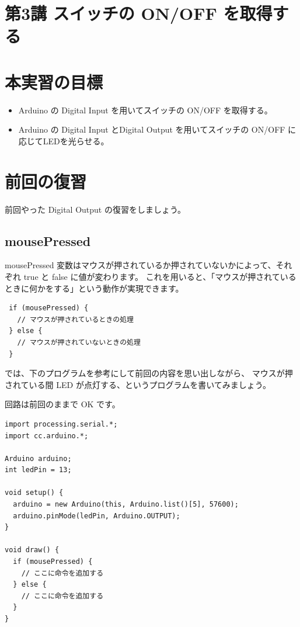 \documentclass[11pt,a4paper]{jarticle}
\begin{document}
\section*{\LARGE{第3講 スイッチの ON/OFF を取得する}}
\section{本実習の目標}
\begin{itemize}
 \item Arduino の Digital Input を用いてスイッチの ON/OFF を取得する。
 \item Arduino の Digital Input とDigital Output を用いてスイッチの ON/OFF に応じてLEDを光らせる。
\end{itemize}


\section{前回の復習}
前回やった Digital Output の復習をしましょう。

\subsection*{mousePressed}
mousePressed 変数はマウスが押されているか押されていないかによって、それぞれ true と false に値が変わります。
これを用いると、「マウスが押されているときに何かをする」という動作が実現できます。

\begin{lstlisting}
 if (mousePressed) {
   // マウスが押されているときの処理
 } else {
   // マウスが押されていないときの処理
 }
\end{lstlisting}

では、下のプログラムを参考にして前回の内容を思い出しながら、
マウスが押されている間 LED が点灯する、というプログラムを書いてみましょう。

回路は前回のままで OK です。

\begin{lstlisting}
import processing.serial.*;
import cc.arduino.*;
 
Arduino arduino;
int ledPin = 13;
 
void setup() {
  arduino = new Arduino(this, Arduino.list()[5], 57600);
  arduino.pinMode(ledPin, Arduino.OUTPUT);
}
 
void draw() {
  if (mousePressed) {
    // ここに命令を追加する
  } else {
    // ここに命令を追加する
  }
}
\end{lstlisting}
\end{document}
